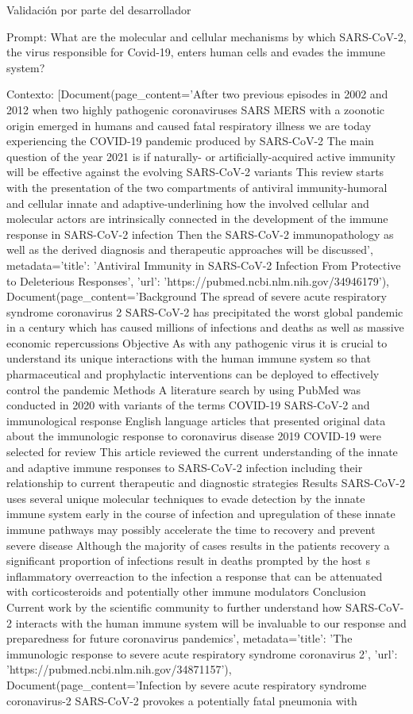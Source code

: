Validación por parte del desarrollador

Prompt: What are the molecular and cellular mechanisms by which SARS-CoV-2, the virus responsible for Covid-19, enters human cells and evades the immune system?

Contexto: [Document(page\_content='After two previous episodes in 2002 and 2012 when two highly pathogenic coronaviruses SARS MERS with a zoonotic origin emerged in humans and caused fatal respiratory illness we are today experiencing the COVID-19 pandemic produced by SARS-CoV-2 The main question of the year 2021 is if naturally- or artificially-acquired active immunity will be effective against the evolving SARS-CoV-2 variants This review starts with the presentation of the two compartments of antiviral immunity-humoral and cellular innate and adaptive-underlining how the involved cellular and molecular actors are intrinsically connected in the development of the immune response in SARS-CoV-2 infection Then the SARS-CoV-2 immunopathology as well as the derived diagnosis and therapeutic approaches will be discussed', metadata={'title': 'Antiviral Immunity in SARS-CoV-2 Infection From Protective to Deleterious Responses', 'url': 'https://pubmed.ncbi.nlm.nih.gov/34946179'}), Document(page\_content='Background The spread of severe acute respiratory syndrome coronavirus 2 SARS-CoV-2 has precipitated the worst global pandemic in a century which has caused millions of infections and deaths as well as massive economic repercussions Objective As with any pathogenic virus it is crucial to understand its unique interactions with the human immune system so that pharmaceutical and prophylactic interventions can be deployed to effectively control the pandemic Methods A literature search by using PubMed was conducted in 2020 with variants of the terms COVID-19 SARS-CoV-2 and immunological response English language articles that presented original data about the immunologic response to coronavirus disease 2019 COVID-19 were selected for review This article reviewed the current understanding of the innate and adaptive immune responses to SARS-CoV-2 infection including their relationship to current therapeutic and diagnostic strategies Results SARS-CoV-2 uses several unique molecular techniques to evade detection by the innate immune system early in the course of infection and upregulation of these innate immune pathways may possibly accelerate the time to recovery and prevent severe disease Although the majority of cases results in the patients recovery a significant proportion of infections result in deaths prompted by the host s inflammatory overreaction to the infection a response that can be attenuated with corticosteroids and potentially other immune modulators Conclusion Current work by the scientific community to further understand how SARS-CoV-2 interacts with the human immune system will be invaluable to our response and preparedness for future coronavirus pandemics', metadata={'title': 'The immunologic response to severe acute respiratory syndrome coronavirus 2', 'url': 'https://pubmed.ncbi.nlm.nih.gov/34871157'}), Document(page\_content='Infection by severe acute respiratory syndrome coronavirus-2 SARS-CoV-2 provokes a potentially fatal pneumonia with 